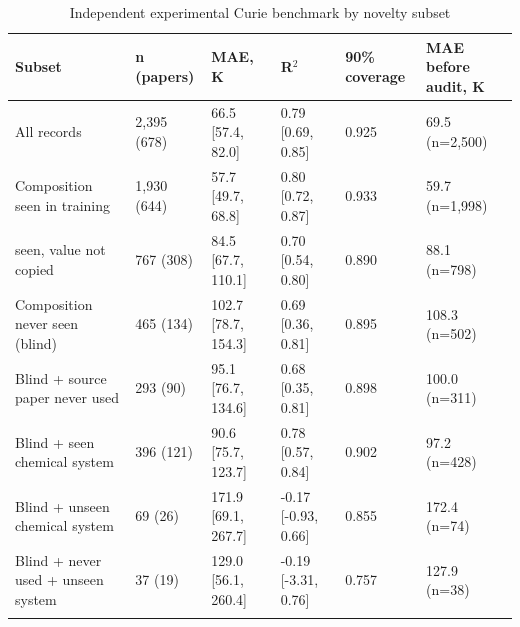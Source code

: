 \begin{table}[h]
\caption{Independent experimental Curie benchmark by novelty subset}
\label{tab:table5_external_benchmark}
\begin{tabular*}{\textwidth}{@{\extracolsep\fill}llllll}
\toprule
Subset & n (papers) & MAE, K & R$^2$ & 90\% coverage & MAE before audit, K \\
\midrule
All records & 2,395 (678) & 66.5 [57.4, 82.0] & 0.79 [0.69, 0.85] & 0.925 & 69.5 (n=2,500) \\
Composition seen in training & 1,930 (644) & 57.7 [49.7, 68.8] & 0.80 [0.72, 0.87] & 0.933 & 59.7 (n=1,998) \\
  seen, value not copied & 767 (308) & 84.5 [67.7, 110.1] & 0.70 [0.54, 0.80] & 0.890 & 88.1 (n=798) \\
Composition never seen (blind) & 465 (134) & 102.7 [78.7, 154.3] & 0.69 [0.36, 0.81] & 0.895 & 108.3 (n=502) \\
Blind + source paper never used & 293 (90) & 95.1 [76.7, 134.6] & 0.68 [0.35, 0.81] & 0.898 & 100.0 (n=311) \\
Blind + seen chemical system & 396 (121) & 90.6 [75.7, 123.7] & 0.78 [0.57, 0.84] & 0.902 & 97.2 (n=428) \\
Blind + unseen chemical system & 69 (26) & 171.9 [69.1, 267.7] & -0.17 [-0.93, 0.66] & 0.855 & 172.4 (n=74) \\
Blind + never used + unseen system & 37 (19) & 129.0 [56.1, 260.4] & -0.19 [-3.31, 0.76] & 0.757 & 127.9 (n=38) \\
\botrule
\end{tabular*}
\end{table}
